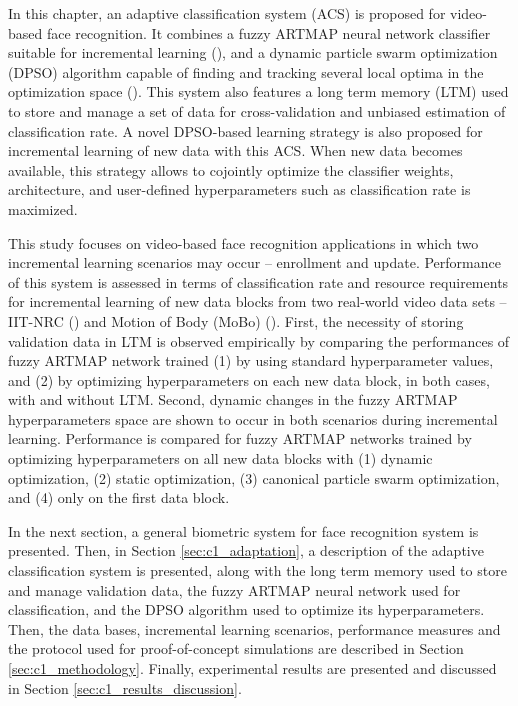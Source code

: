 In this chapter, an adaptive classification system (ACS) is proposed for video-based face recognition. It combines a fuzzy ARTMAP neural network classifier suitable for incremental learning (\cite{carpenter92}), and a dynamic particle swarm optimization (DPSO) algorithm capable of finding and tracking several local optima in the optimization space (\cite{nickabadi08_2}). This system also features a long term memory (LTM) used to store and manage a set of data for cross-validation and unbiased estimation of classification rate. A novel DPSO-based learning strategy is also proposed for incremental learning of new data with this ACS. When new data becomes available, this strategy allows to cojointly optimize the classifier weights, architecture, and user-defined hyperparameters such as classification rate is maximized.

This study focuses on video-based face recognition applications in which two incremental learning scenarios may occur -- enrollment and update. Performance of this system is assessed in terms of classification rate and resource requirements for incremental learning of new data blocks from two real-world video data sets -- IIT-NRC (\cite{gorodnichy05}) and Motion of Body (MoBo) (\cite{gross02}). First, the necessity of storing validation data in LTM is observed empirically by comparing the performances of fuzzy ARTMAP network trained (1) by using standard hyperparameter values, and (2) by optimizing hyperparameters on each new data block, in both cases, with and without LTM. Second, dynamic changes in the fuzzy ARTMAP hyperparameters space are shown to occur in both scenarios during incremental learning. Performance is compared for fuzzy ARTMAP networks trained by optimizing hyperparameters on all new data blocks with (1) dynamic optimization, (2) static optimization, (3) canonical particle swarm optimization, and (4) only on the first data block.

In the next section, a general biometric system for face recognition system is presented. Then, in Section \ref{sec:c1_adaptation}, a description of the adaptive classification system is presented, along with the long term memory used to store and manage validation data, the fuzzy ARTMAP neural network used for classification, and the DPSO algorithm used to optimize its hyperparameters. Then, the data bases, incremental learning scenarios, performance measures and the protocol used for proof-of-concept simulations are described in Section \ref{sec:c1_methodology}. Finally, experimental results are presented and discussed in Section \ref{sec:c1_results_discussion}.

